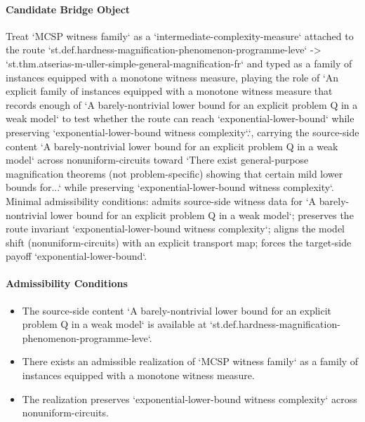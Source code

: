 \documentclass[11pt]{article}
\begin{document}
\paragraph{Candidate Bridge Object}
Treat `MCSP witness family` as a `intermediate-complexity-measure` attached to the route `st.def.hardness-magnification-phenomenon-programme-leve` -> `st.thm.atserias-m-uller-simple-general-magnification-fr` and typed as a family of instances equipped with a monotone witness measure, playing the role of `An explicit family of instances equipped with a monotone witness measure that records enough of `A barely-nontrivial lower bound for an explicit problem Q in a weak model` to test whether the route can reach `exponential-lower-bound` while preserving `exponential-lower-bound witness complexity`.`, carrying the source-side content `A barely-nontrivial lower bound for an explicit problem Q in a weak model` across nonuniform-circuits toward `There exist general-purpose magnification theorems (not problem-specific) showing that certain mild lower bounds for...` while preserving `exponential-lower-bound witness complexity`. Minimal admissibility conditions: admits source-side witness data for `A barely-nontrivial lower bound for an explicit problem Q in a weak model`; preserves the route invariant `exponential-lower-bound witness complexity`; aligns the model shift (nonuniform-circuits) with an explicit transport map; forces the target-side payoff `exponential-lower-bound`.
\paragraph{Admissibility Conditions}
\begin{itemize}
\item The source-side content `A barely-nontrivial lower bound for an explicit problem Q in a weak model` is available at `st.def.hardness-magnification-phenomenon-programme-leve`.
\item There exists an admissible realization of `MCSP witness family` as a family of instances equipped with a monotone witness measure.
\item The realization preserves `exponential-lower-bound witness complexity` across nonuniform-circuits.
\end{itemize}
\end{document}
